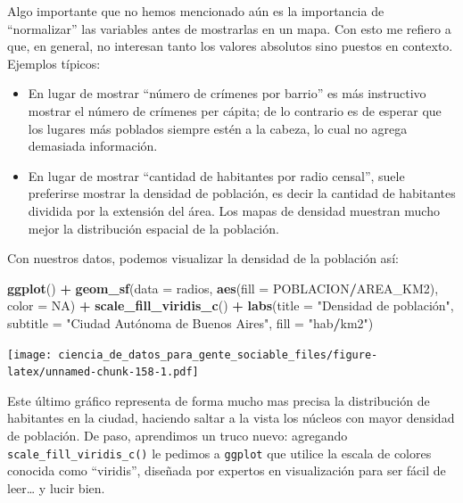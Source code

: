 \documentclass[spanish,]{book}
\newenvironment{Shaded}{\begin{snugshade}}{\end{snugshade}}
\newcommand{\DataTypeTok}[1]{\textcolor[rgb]{0.13,0.29,0.53}{#1}}
\newcommand{\KeywordTok}[1]{\textcolor[rgb]{0.13,0.29,0.53}{\textbf{#1}}}
\newcommand{\NormalTok}[1]{#1}
\newcommand{\OperatorTok}[1]{\textcolor[rgb]{0.81,0.36,0.00}{\textbf{#1}}}
\newcommand{\OtherTok}[1]{\textcolor[rgb]{0.56,0.35,0.01}{#1}}
\newcommand{\StringTok}[1]{\textcolor[rgb]{0.31,0.60,0.02}{#1}}
\providecommand{\tightlist}{%
  \setlength{\itemsep}{0pt}\setlength{\parskip}{0pt}}
\begin{document}
Algo importante que no hemos mencionado aún es la importancia de ``normalizar'' las variables antes de mostrarlas en un mapa. Con esto me refiero a que, en general, no interesan tanto los valores absolutos sino puestos en contexto. Ejemplos típicos:

\begin{itemize}
\tightlist
\item
  En lugar de mostrar ``número de crímenes por barrio'' es más instructivo mostrar el número de crímenes per cápita; de lo contrario es de esperar que los lugares más poblados siempre estén a la cabeza, lo cual no agrega demasiada información.\\
\item
  En lugar de mostrar ``cantidad de habitantes por radio censal'', suele preferirse mostrar la densidad de población, es decir la cantidad de habitantes dividida por la extensión del área. Los mapas de densidad muestran mucho mejor la distribución espacial de la población.
\end{itemize}

Con nuestros datos, podemos visualizar la densidad de la población así:

\begin{Shaded}
\begin{Highlighting}[]
\KeywordTok{ggplot}\NormalTok{() }\OperatorTok{+}\StringTok{ }
\StringTok{    }\KeywordTok{geom_sf}\NormalTok{(}\DataTypeTok{data =}\NormalTok{ radios, }\KeywordTok{aes}\NormalTok{(}\DataTypeTok{fill =}\NormalTok{ POBLACION}\OperatorTok{/}\NormalTok{AREA_KM2), }\DataTypeTok{color =} \OtherTok{NA}\NormalTok{) }\OperatorTok{+}
\StringTok{    }\KeywordTok{scale_fill_viridis_c}\NormalTok{() }\OperatorTok{+}
\StringTok{    }\KeywordTok{labs}\NormalTok{(}\DataTypeTok{title =} \StringTok{"Densidad de población",}
\StringTok{         subtitle = "}\NormalTok{Ciudad Autónoma de Buenos Aires}\StringTok{",}
\StringTok{         fill = "}\NormalTok{hab}\OperatorTok{/}\NormalTok{km2}\StringTok{")}
\end{Highlighting}
\end{Shaded}

\texttt{[image: ciencia\_de\_datos\_para\_gente\_sociable\_files/figure-latex/unnamed-chunk-158-1.pdf]}

Este último gráfico representa de forma mucho mas precisa la distribución de habitantes en la ciudad, haciendo saltar a la vista los núcleos con mayor densidad de población. De paso, aprendimos un truco nuevo: agregando \texttt{scale\_fill\_viridis\_c()} le pedimos a \texttt{ggplot} que utilice la escala de colores conocida como ``viridis'', diseñada por expertos en visualización para ser fácil de leer\ldots{} y lucir bien.
\end{document}
